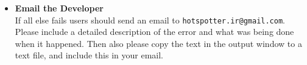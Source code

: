 \documentclass[a4paper,10pt]{article}
\makeatletter
\newcommand{\developeremail}{{\tt hotspotter.ir@gmail.com}}
\makeatother
\begin{document}
\begin{itemize}
    \item \textbf{Email the Developer}\\
        If all else fails users should send an email to \developeremail{}.
        Please include a detailed description of the error and what was being done when it
            happened.  Then also please copy the text in the output window to a text file, and include this in your email.\\
    \end{itemize}

%
%
%
%
\end{document}
